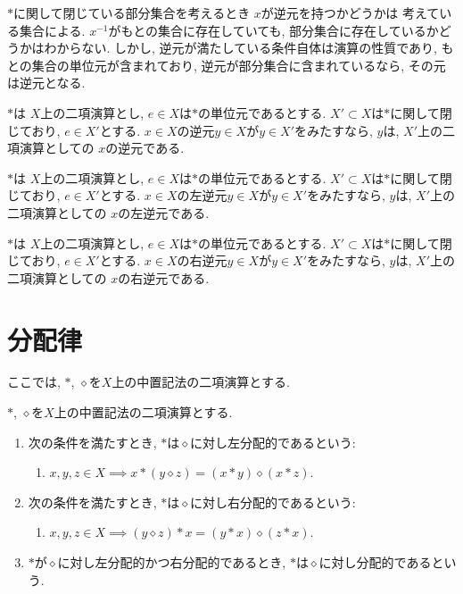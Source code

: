 $\ast$に関して閉じている部分集合を考えるとき
$x$が逆元を持つかどうかは
考えている集合による.
$x^{-1}$がもとの集合に存在していても,
部分集合に存在しているかどうかはわからない.
しかし,
逆元が満たしている条件自体は演算の性質であり,
もとの集合の単位元が含まれており,
逆元が部分集合に含まれているなら,
その元は逆元となる.
\begin{prop}
  $\ast$は
  $X$上の二項演算とし,
  $e\in X$は$\ast$の単位元であるとする.
  $X'\subset X$は$\ast$に関して閉じており,
  $e\in X'$とする.
  $x\in X$の逆元$y\in X$が$y\in X'$をみたすなら,
  $y$は,
  $X'$上の二項演算としての
  $x$の逆元である.
\end{prop}
\begin{prop}
  $\ast$は
  $X$上の二項演算とし,
  $e\in X$は$\ast$の単位元であるとする.
  $X'\subset X$は$\ast$に関して閉じており,
  $e\in X'$とする.
  $x\in X$の左逆元$y\in X$が$y\in X'$をみたすなら,
  $y$は,
  $X'$上の二項演算としての
  $x$の左逆元である.
\end{prop}
\begin{prop}
  $\ast$は
  $X$上の二項演算とし,
  $e\in X$は$\ast$の単位元であるとする.
  $X'\subset X$は$\ast$に関して閉じており,
  $e\in X'$とする.
  $x\in X$の右逆元$y\in X$が$y\in X'$をみたすなら,
  $y$は,
  $X'$上の二項演算としての
  $x$の右逆元である.
\end{prop}


\section{分配律}
ここでは, $\ast$, $\diamond$を$X$上の中置記法の二項演算とする.
\begin{definition}
  $\ast$, $\diamond$を$X$上の中置記法の二項演算とする.
  \begin{enumerate}
  \item 次の条件を満たすとき,
    $\ast$は$\diamond$に対し左分配的であるという:
    \begin{enumerate}
      \item $x,y,z\in X \implies x\ast (y\diamond z)=(x\ast y)\diamond (x\ast z)$.
    \end{enumerate}
  \item 次の条件を満たすとき,
    $\ast$は$\diamond$に対し右分配的であるという:
    \begin{enumerate}
      \item $x,y,z\in X \implies (y\diamond z) \ast x=(y\ast x)\diamond (z\ast x)$.
    \end{enumerate}
  \item 
    $\ast$が$\diamond$に対し左分配的かつ右分配的であるとき,
    $\ast$は$\diamond$に対し分配的であるという.
  \end{enumerate}
\end{definition}

